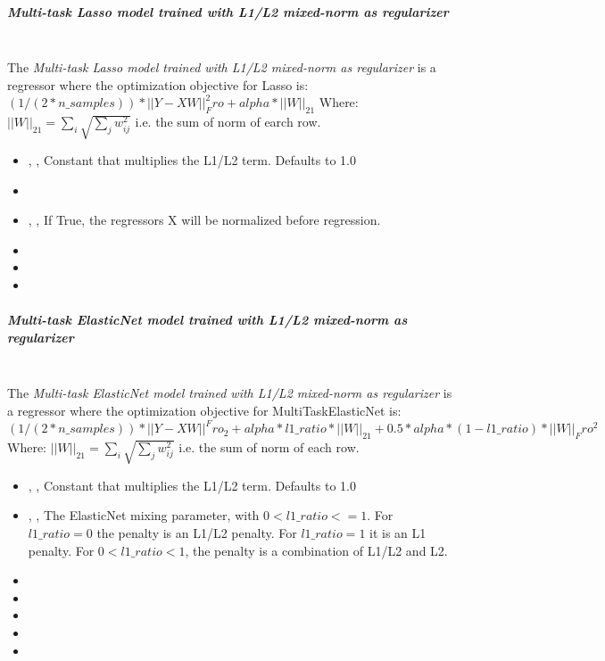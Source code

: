 \subparagraph{Multi-task Lasso model trained with L1/L2 mixed-norm as
  regularizer }
\mbox{}
\\The \textit{Multi-task Lasso model trained with L1/L2 mixed-norm as
  regularizer} is a regressor where the optimization objective for Lasso is:
$(1 / (2 * n\_samples)) * ||Y - XW||^2_Fro + alpha * ||W||_21$
Where:
$||W||_21 = \sum_i \sqrt{\sum_j w_{ij}^2}$
i.e. the sum of norm of earch row.
%
\begin{itemize}
  \item {} , ,
  Constant that multiplies the L1/L2 term.
  Defaults to 1.0
  \item {}
  \item {} , ,
  If True, the regressors X will be normalized before regression.
  \item \maxIterDescription{}
  \item {}
  \item \warmStartDescription{}
\end{itemize}

\subparagraph{Multi-task ElasticNet model trained with L1/L2 mixed-norm as
  regularizer}
\mbox{}
\\The \textit{Multi-task ElasticNet model trained with L1/L2 mixed-norm as
  regularizer} is a regressor where the optimization objective for
MultiTaskElasticNet is:
$(1 / (2 * n\_samples)) * ||Y - XW||^Fro_2
+ alpha * l1\_ratio * ||W||_21
+ 0.5 * alpha * (1 - l1\_ratio) * ||W||_Fro^2$
Where:
$||W||_21 = \sum_i \sqrt{\sum_j w_{ij}^2}$
i.e. the sum of norm of each row.
%
\begin{itemize}
  \item {} , ,
  Constant that multiplies the L1/L2 term.
  Defaults to 1.0
  \item {} , ,
  The ElasticNet mixing parameter, with $0 < l1\_ratio <= 1$.
  For $l1\_ratio = 0$ the penalty is an L1/L2 penalty.
  For $l1\_ratio = 1$ it is an L1 penalty.
  For $0 < l1\_ratio < 1$, the penalty is a combination of L1/L2
  and L2.
  \item {}
  \item {}
  \item \maxIterDescription{}
  \item {}
  \item \warmStartDescription{}
\end{itemize}

